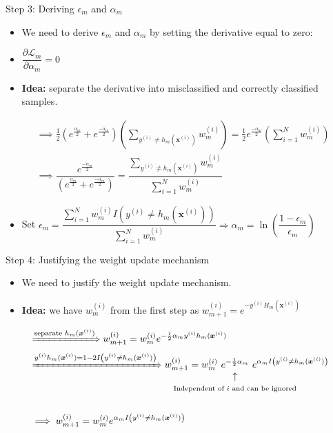 \documentclass[serif, aspectratio=169]{beamer}
\makeatletter
\newcommand\vertarrowbox[3][6ex]{%
  \begin{array}[t]{@{}c@{}} #2 \\
  \left\uparrow\vcenter{\hrule height #1}\right.\kern-\nulldelimiterspace\\
  \makebox[0pt]{\scriptsize#3}
  \end{array}%
}
\makeatother
\begin{document}
\begin{frame}{Step 3: Deriving $\epsilon_m$ and $\alpha_m$}
    \begin{itemize}
        \itemsep1em
        \justifying
        \item We need to derive $\epsilon_m$ and $\alpha_m$ by setting the derivative equal to zero:
        \item[] \begin{center}
            $\dfrac{\partial \mathcal{L}_m}{\partial \alpha_m} = 0$
        \end{center}
        \item \textbf{Idea:} separate the derivative into misclassified and correctly classified samples.
    \end{itemize}
    \begin{align*}
        &\implies \frac{1}{2} (e^{\frac{\alpha_m}{2}} + e^{\frac{-\alpha_m}{2}}) \left(\displaystyle\sum_{y^{(i)}\neq h_m(\boldsymbol{x}^{(i)})} w_m^{(i)} \right) = \frac{1}{2}e^{\frac{-\alpha_m}{2}} \left(\displaystyle\sum_{i=1}^Nw_m^{(i)} \right) \\
        &\implies \dfrac{e^{\frac{-\alpha_m}{2}}}{(e^{\frac{\alpha_m}{2}} + e^{\frac{-\alpha_m}{2}})} = \dfrac{\sum_{y^{(i)}\neq h_m(\boldsymbol{x}^{(i)})} w_m^{(i)}}{\sum_{i=1}^Nw_m^{(i)}}
    \end{align*}
    \begin{itemize}
        \itemsep1em
        \justifying
        \item Set $\epsilon_m = \dfrac{\sum_{i=1}^N w_m^{(i)}I\left(y^{(i)} \neq h_m(\boldsymbol{x}^{(i)})\right)}{\sum_{i=1}^N w_m^{(i)}} \Longrightarrow \alpha_m = \ln\left(\dfrac{1 - \epsilon_m}{\epsilon_m}\right)$
    \end{itemize}
\end{frame}

\begin{frame}{Step 4: Justifying the weight update mechanism}
    \begin{itemize}
        \itemsep1em
        \justifying
        \item We need to justify the weight update mechanism.
        \item \textbf{Idea:} we have $w_m^{(i)}$ from the first step as $w_{m+1}^{(i)} = e^{-y^{(i)}H_{m}(\boldsymbol{x}^{(i)})}$
    \end{itemize}
    \begin{align*}
        &\xRightarrow{\text{separate } h_m(\boldsymbol{x}^{(i)})}w_{m+1}^{(i)} = w_m^{(i)} e^{-\frac{1}{2}\alpha_my^{(i)}h_m(\boldsymbol{x}^{(i)})} \\
        &\xRightarrow{y^{(i)}h_m(\boldsymbol{x}^{(i)}) = 1 - 2I\left(y^{(i)} \neq h_m(\boldsymbol{x}^{(i)})\right)} w_{m+1}^{(i)} = w_m^{(i)}
        \text{\vertarrowbox[0ex]{\ e^{-\frac{1}{2}\alpha_m}\ }{Independent of $i$ and can be ignored}}
        e^{\alpha_mI\left(y^{(i)} \neq h_m(\boldsymbol{x}^{(i)})\right)} \\ \\
        &\implies w_{m+1}^{(i)} = w_m^{(i)}e^{\alpha_m I\left(y^{(i)} \neq h_m(\boldsymbol{x}^{(i)})\right)}
    \end{align*}
\end{frame}
\end{document}
